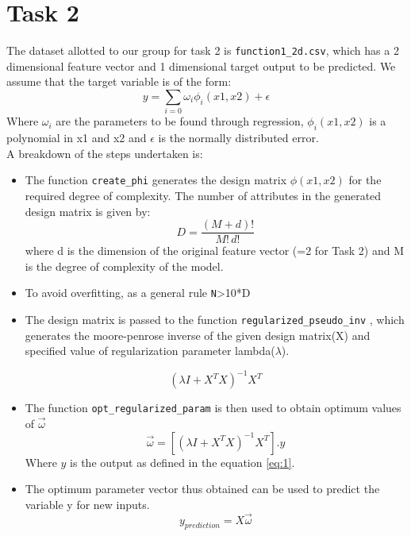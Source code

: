 \documentclass[12pt,a4paper]{article}
\def\tt#1{\texttt{#1}}
\begin{document}
\section{Task 2}

The dataset allotted to our group for task 2 is \tt{function1\_2d.csv}, which has a 2 dimensional feature vector and 1 dimensional target output to be predicted. We assume that the target variable is of the form:
\begin{equation}\label{eq:1}
    y=\sum_{i=0}\omega _{i}\phi_{i}(x1,x2)  +\epsilon 
\end{equation}
Where $\omega_{i}$ are the parameters to be found through regression, $\phi_{i}(x1,x2)$ is a polynomial in x1 and x2 and $\epsilon$ is the normally distributed error. 
\\ A breakdown of the steps undertaken is:

\begin{itemize}
    \item The function \tt{create\_phi} generates the design matrix $\phi(x1,x2)$ for the required degree of complexity.
    The number of attributes in the generated design matrix is given by:
    \begin{equation}
        D=\frac{(M+d)!}{M!\,d!}
    \end{equation}
    where d is the dimension of the original feature vector (=2 for Task 2) and M is the degree of complexity of the model.
    \item To avoid overfitting, as a general rule \tt{N}>10*D 
    \item The design matrix is passed to the function \tt{regularized\_pseudo\_inv} , which generates the moore-penrose inverse of the given design matrix(X) and specified value of regularization parameter lambda($\lambda$).
    
    \begin{equation}
         (\lambda I+X^{T}X)^{-1}X^{T}
    \end{equation}
    
    \item The function \tt{opt\_regularized\_param} is then used to obtain optimum values of $\vec{\omega}$
    \begin{equation}
        \vec{\omega} = [(\lambda I+X^{T}X)^{-1}X^{T}].y
    \end{equation}
    Where $y$ is the output as defined in the equation \ref{eq:1}.
    
    \item The optimum parameter vector thus obtained can be used to predict the variable y for new inputs. 
    \begin{equation}
        y_{prediction}=X\vec{\omega}
    \end{equation}
\end{itemize}
\end{document}
